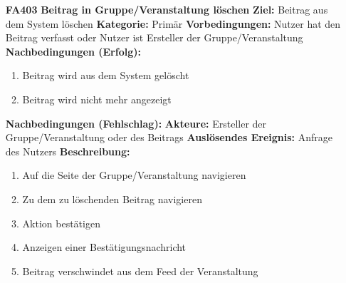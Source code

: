 \documentclass[parskip=full]{scrartcl}
\begin{document}
\begin{itemize}[nosep]
			\item[\textbf{FA403}]\textbf{Beitrag in Gruppe/Veranstaltung löschen}
			\newline \textbf{Ziel:} Beitrag aus dem System löschen
			\newline \textbf{Kategorie:} Primär
			\newline \textbf{Vorbedingungen:} Nutzer hat den Beitrag verfasst oder Nutzer ist Ersteller der Gruppe/Veranstaltung
			\newline \textbf{Nachbedingungen (Erfolg):}
			\begin{enumerate}[nosep]
				\item Beitrag wird aus dem System gelöscht
				\item Beitrag wird nicht mehr angezeigt
			\end{enumerate}
			\textbf{Nachbedingungen (Fehlschlag):}
			\newline \textbf{Akteure:} Ersteller der Gruppe/Veranstaltung oder des Beitrags
			\newline \textbf{Auslösendes Ereignis:} Anfrage des Nutzers
			\newline \textbf{Beschreibung:}
			\begin{enumerate}[nosep]
				\item Auf die Seite der Gruppe/Veranstaltung navigieren
				\item Zu dem zu löschenden Beitrag navigieren
				\item Aktion bestätigen
				\item Anzeigen einer Bestätigungsnachricht
				\item Beitrag verschwindet aus dem \gls{Feed} der Veranstaltung\\
			\end{enumerate}
			

\end{itemize}
\end{document}
